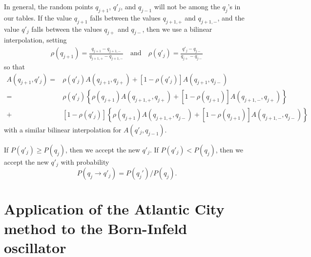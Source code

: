 \documentclass[prd,preprint,floatfix,showpacs]{revtex4-1}
\begin{document}
In general, the random points \( q_{j+1} \),
\( q'_j \), and \( q_{j-1} \) will not be among
the \( q_j \)'s in our tables.
If the value \( q_{j+1} \) falls
between the values
\( q_{j+1,+} \) and \( q_{j+1, -} \),
and the value \( q'_j \) falls
between the values
\( q_{j+} \) and \( q_{j-} \),
then we use a bilinear interpolation, setting
\begin{equation}
\begin{split}
\rho(q_{j+1}) = \frac{q_{j+1} - q_{j+1, -}}{q_{j+1,+} - q_{j+1, -} } 
\quad\mbox{and}\quad
\rho(q'_j) = \frac{q'_j - q_{j-}}{q_{j+} - q_{j-}} 
\label {setting}
\end{split}
\end{equation}
so that
\begin{equation}
   \begin{split}
A(q_{j+1}, q'_j) = {} & \rho(q'_j)  A(q_{j+1}, q_{j+})
+ \left[ 1 - \rho(q'_j) \right] A(q_{j+1}, q_{j-}) 
\\
= {}& \rho(q'_j) 
\left\{ \rho(q_{j+1}) 
A(q_{j+1,+}, q_{j+}) + \left[ 1 - \rho(q_{j+1}) \right]
A(q_{j+1,-}, q_{j+}) \right\}
\\
+{}& \left[ 1 - \rho(q'_j) \right]
\left\{ \rho(q_{j+1})
A(q_{j+1,+}, q_{j-}) +
\left[ 1 - \rho(q_{j+1}) \right]
A(q_{j+1,-}, q_{j-}) \right\}  
\label {we interpolate and use the value}
   \end{split}
\end{equation}
with a similar bilinear interpolation for \( A(q'_{j}, q_{j-1}) \)\@.
\par
If \( P(q'_j) \ge P(q_j) \), then we accept
the new  \( q'_j \)\@.
If \( P(q'_j) < P(q_j) \), then we 
accept the new  \( q'_j \) with probability
\begin{equation}
P(q_j \to q'_j) = P(q_j')/P(q_j) .
 \label {probability distribution 2}
\end{equation}

\section{Application of the Atlantic City method to the  Born-Infeld oscillator
\label {Application of the Atlantic City method to the 
Born-Infeld oscillator}}
\end{document}

